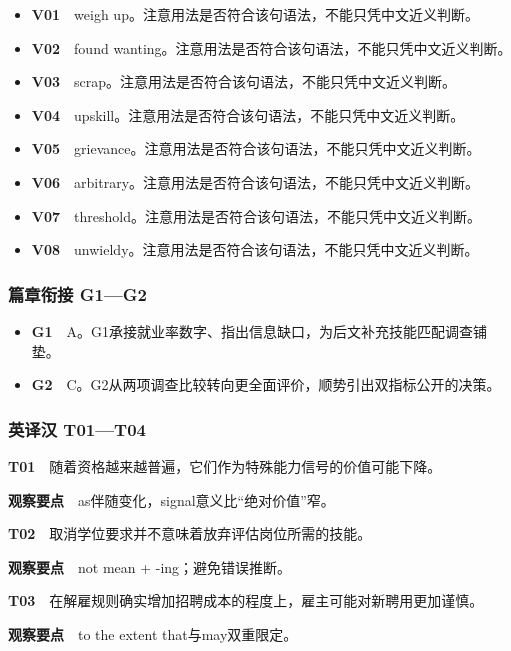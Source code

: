 \documentclass[
  11pt,
]{ctexart}
\begin{document}
\begin{itemize}
\item
  \textbf{V01}　weigh
  up。注意用法是否符合该句语法，不能只凭中文近义判断。
\item
  \textbf{V02}　found
  wanting。注意用法是否符合该句语法，不能只凭中文近义判断。
\item
  \textbf{V03}　scrap。注意用法是否符合该句语法，不能只凭中文近义判断。
\item
  \textbf{V04}　upskill。注意用法是否符合该句语法，不能只凭中文近义判断。
\item
  \textbf{V05}　grievance。注意用法是否符合该句语法，不能只凭中文近义判断。
\item
  \textbf{V06}　arbitrary。注意用法是否符合该句语法，不能只凭中文近义判断。
\item
  \textbf{V07}　threshold。注意用法是否符合该句语法，不能只凭中文近义判断。
\item
  \textbf{V08}　unwieldy。注意用法是否符合该句语法，不能只凭中文近义判断。
\end{itemize}

\subsubsection{篇章衔接 G1---G2}\label{ux7bc7ux7ae0ux8854ux63a5-g1g2}

\begin{itemize}
\item
  \textbf{G1}　A。G1承接就业率数字、指出信息缺口，为后文补充技能匹配调查铺垫。
\item
  \textbf{G2}　C。G2从两项调查比较转向更全面评价，顺势引出双指标公开的决策。
\end{itemize}

\subsubsection{英译汉 T01---T04}\label{ux82f1ux8bd1ux6c49-t01t04}

\textbf{T01}　随着资格越来越普遍，它们作为特殊能力信号的价值可能下降。

\textbf{观察要点}　as伴随变化，signal意义比``绝对价值''窄。

\textbf{T02}　取消学位要求并不意味着放弃评估岗位所需的技能。

\textbf{观察要点}　not mean + -ing；避免错误推断。

\textbf{T03}　在解雇规则确实增加招聘成本的程度上，雇主可能对新聘用更加谨慎。

\textbf{观察要点}　to the extent that与may双重限定。
\end{document}
